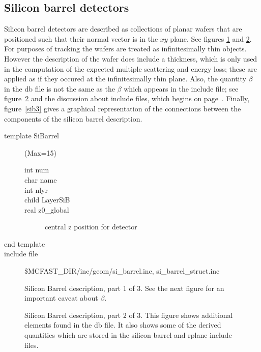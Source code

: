 \filbreak

\subsection{Silicon barrel detectors}
\label{page:sib:detectors} Silicon barrel detectors
are described as collections of planar wafers that are positioned
such that their normal vector is in the $xy$ plane.
See figures \ref{sib1} and \ref{sib2}.  For
purposes of tracking the wafers are treated as
infinitesimally thin objects.  However the description of the
wafer does include a thickness, which is only used
in the computation of the expected multiple scattering and energy loss;
these are applied as if they occured at the infinitesimally thin plane.
Also, the quantity $\beta$ in the db file is not the same as the
$\beta$ which appears in the include file; see figure~\ref{sib2} and
the discussion about include files, which begins on 
page~\pageref{page:sib:include}.  
Finally, figure~\ref{sib3} gives a
graphical representation of the connections between the components of
the silicon barrel description.

\begin{description}
\item[{\rm template} SiBarrel](Max=15)
\begin{description}
\item[{\rm  int} num]
\item[{\rm  char} name]
\item[{\rm  int} nlyr]
\item[{\rm  child} LayerSiB]
\item[{\rm  real} z0\_global]  central z position for detector
\end{description}
\item[end template]
\item[include file] \$MCFAST\_DIR/inc/geom/si\_barrel.inc, 
si\_barrel\_struct.inc 
\end{description}

\begin{figure} [htbp]
\centerline{\epsfxsize=5.0in }
\caption{\label{sib1} Silicon Barrel description, part 1 of 3.
See the next figure for an important caveat about $\beta$.
}

\end{figure}

\begin{figure} [htbp]
\centerline{\epsfxsize=5.0in }
\caption{\label{sib2} Silicon Barrel description, part 2 of 3.
This figure shows additional elements found in the db file.  It also
shows some of the derived quantities which are stored in the 
silicon barrel and rplane include files.}
\end{figure}



